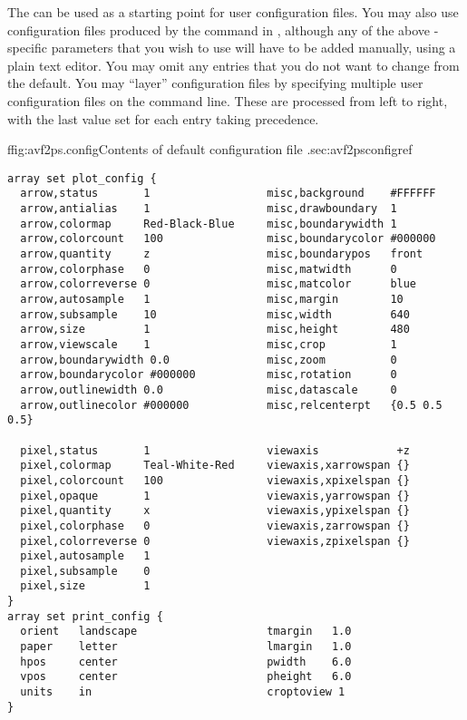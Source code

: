 The  can be used as a starting point for
user configuration files.  You may also use configuration files produced
by the  command in
, although any of the above
-specific parameters that you wish to use will have to be
added manually, using a plain text editor.  You may omit any entries
that you do not want to change from the default.  You may ``layer''
configuration files by specifying multiple user configuration files on
the command line.  These are processed from left to right, with the last
value set for each entry taking precedence.

\begin{codelisting}{f}{fig:avf2ps.config}{Contents of default configuration
  file .}{sec:avf2psconfig}{ref}
\begin{verbatim}
array set plot_config {
  arrow,status       1                  misc,background    #FFFFFF
  arrow,antialias    1                  misc,drawboundary  1
  arrow,colormap     Red-Black-Blue     misc,boundarywidth 1
  arrow,colorcount   100                misc,boundarycolor #000000
  arrow,quantity     z                  misc,boundarypos   front
  arrow,colorphase   0                  misc,matwidth      0
  arrow,colorreverse 0                  misc,matcolor      blue
  arrow,autosample   1                  misc,margin        10
  arrow,subsample    10                 misc,width         640
  arrow,size         1                  misc,height        480
  arrow,viewscale    1                  misc,crop          1
  arrow,boundarywidth 0.0               misc,zoom          0
  arrow,boundarycolor #000000           misc,rotation      0
  arrow,outlinewidth 0.0                misc,datascale     0
  arrow,outlinecolor #000000            misc,relcenterpt   {0.5 0.5 0.5}

  pixel,status       1                  viewaxis            +z
  pixel,colormap     Teal-White-Red     viewaxis,xarrowspan {}
  pixel,colorcount   100                viewaxis,xpixelspan {}
  pixel,opaque       1                  viewaxis,yarrowspan {}
  pixel,quantity     x                  viewaxis,ypixelspan {}
  pixel,colorphase   0                  viewaxis,zarrowspan {}
  pixel,colorreverse 0                  viewaxis,zpixelspan {}
  pixel,autosample   1
  pixel,subsample    0
  pixel,size         1
}
array set print_config {
  orient   landscape                    tmargin   1.0
  paper    letter                       lmargin   1.0
  hpos     center                       pwidth    6.0
  vpos     center                       pheight   6.0
  units    in                           croptoview 1
}
\end{verbatim}
\end{codelisting}

